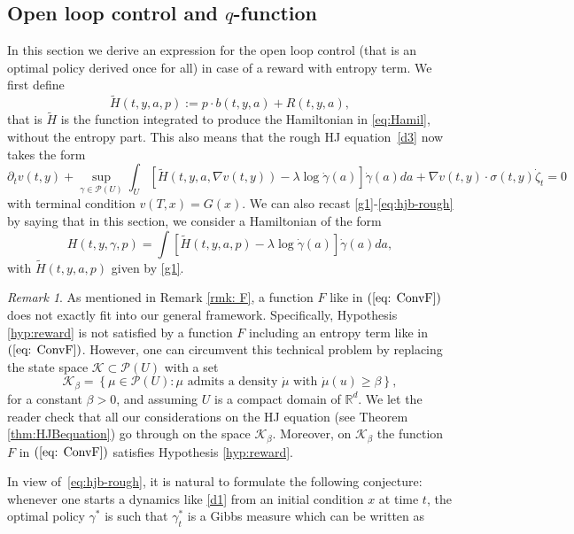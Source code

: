 \documentclass[12pt,reqno]{amsart}
\numberwithin{equation}{section}  %
\newcommand{\1}{{\bf 1}}
\newcommand{\2}{{\bf 2}}
\newcommand{\R}{\mathbb R}
\newcommand{\cp}{\mathcal P}
\newcommand{\ga}{\gamma}
\newcommand{\lc}{\left[}
\newcommand{\rc}{\right]}
\theoremstyle{remark}
\newtheorem{remark}[theorem]{Remark}
\theoremstyle{remark}
\newcommand{\beq}{\begin{equation}}
\newcommand{\eeq}{\end{equation}}
\begin{document}
\subsection{Open loop control and $q$-function}\label{sec:open-loop}
In this section we derive an expression for the open loop control (that is an optimal policy derived once for all) in case of a reward with entropy term. We first define 
\begin{equation}\label{g1}
\tilde{H}(t, y,a,p) := p \cdot b(t,y,a) + R(t,y,a),
\end{equation}
that is $\tilde{H}$ is the function integrated to produce the Hamiltonian in \eqref{eq:Hamil}, without the entropy part. This also means that the rough HJ equation~\eqref{d3} now takes the form
\beq\label{eq:hjb-rough}
	\partial_t v(t,y) + \sup_{\gamma \in \cp(U)} \int_U \left[\tilde{H}(t,y,a,\nabla v(t,y))- \lambda \log \dot \gamma(a) \right] \dot\gamma(a) da
	 + \nabla v(t,y) \cdot \sigma(t,y) \dot \zeta_t = 0
\eeq
with terminal condition $v(T,x) = G(x)$. We can also recast \eqref{g1}-\eqref{eq:hjb-rough} by saying that in this section, we consider a Hamiltonian of the form 
\beq\label{eq:H}
H(t,y,\ga,p) = \int \lc \tilde{H}(t,y,a, p) - \lambda \log \dot{\ga}(a) \rc \dot{\ga}(a) da,
\eeq
with $\tilde{H}(t,y,a,p)$ given by \eqref{g1}.
\begin{remark} \label{rmk: K}
    As mentioned in Remark \ref{rmk: F}, a function $F$ like in $(\ref{eq: ConvF})$ does not exactly fit into our general framework. Specifically, Hypothesis \ref{hyp:reward} is not satisfied by a function $F$ including an entropy term like in $(\ref{eq: ConvF})$. However, one can circumvent this technical problem by replacing the state space $\mathcal{K}\subset \mathcal{P}(U)$ with a set
    \begin{equation}
        \mathcal{K}_{\beta}=\left\{\mu \in \mathcal{P}(U): \mu \text{ admits a density }\dot{\mu} \text{ with } \dot{\mu}(u)\geq\beta \right\},
    \end{equation}
    for a constant $\beta>0$, and assuming $U$ is a compact domain of $\R^d$. We let the reader check that all our considerations on the HJ equation (see Theorem \ref{thm:HJBequation}) go through on the space $\mathcal{K}_{\beta}$. Moreover, on $\mathcal{K}_{\beta}$ the function $F$ in $(\ref{eq: ConvF})$ satisfies Hypothesis \ref{hyp:reward}.  
\end{remark}
In view of~\eqref{eq:hjb-rough}, it is natural to formulate the following conjecture:
whenever one starts a dynamics like \eqref{d1} from an initial condition $x$ at time $t$, the optimal policy $\ga^{\ast}$ is such that $\ga_t^{\ast}$ is a Gibbs measure which can be written as 
\end{document}

